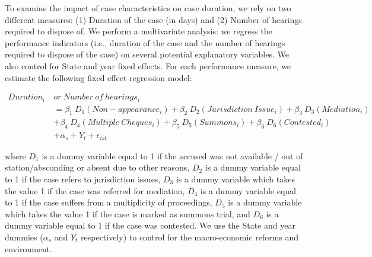 To examine the impact of case characteristics on case duration, we rely on two different measures: (1) Duration of the case (in days) and (2) Number of hearings required to dispose of. We perform a multivariate analysis: we regress the performance indicators (i.e., duration of the case and the number of hearings required to dispose of the case) on several potential explanatory variables. We also control for State and year fixed effects. For each performance measure, we estimate the following fixed effect regression model:

\begin{equation}\label{eq:fe1}
\begin{split}
Duration_i \ & or \ Number \ of \ hearings_i \\
& = \beta_1 \ D_1(Non-appearance_i) + \beta_2 \ D_2(Jurisdiction \ Issue_i) + \beta_3 \ D_3(Mediation_i) \\
& + \beta_4 \ D_4(Multiple \ Cheques_i) + \beta_5 \ D_5(Summons_i) + \beta_6 \ D_6(Contested_i) \\
&  + \alpha_s + Y_t + \epsilon_{ist}
\end{split}
\end{equation}

where $D_1$ is a dummy variable equal to 1 if the accused was not available / out of station/absconding or absent due to other reasons, $D_2$ is a dummy variable equal to 1 if the case refers to jurisdiction issues, $D_3$ is a dummy variable which takes the value 1 if the case was referred for mediation, $D_4$ is a dummy variable equal to 1 if the case suffers from a multiplicity of proceedings, $D_5$ is a dummy variable which takes the value 1 if the case is marked as summons trial, and $D_6$ is a dummy variable equal to 1 if the case was contested. We use the State and year dummies ($\alpha_s$ and $Y_t$ respectively) to control for the macro-economic reforms and environment.


